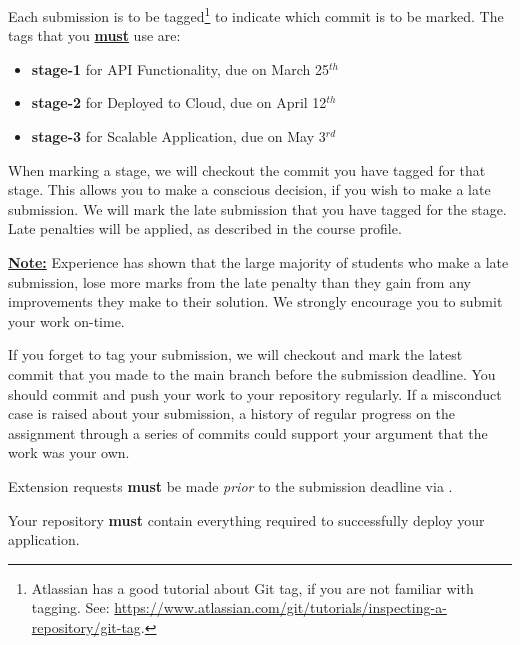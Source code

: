 \documentclass{csse4400}
\begin{document}
Each submission is to be tagged\footnote{Atlassian has a good tutorial about Git tag, if you are not familiar with tagging. See: \url{https://www.atlassian.com/git/tutorials/inspecting-a-repository/git-tag}.}
to indicate which commit is to be marked.
The tags that you \textbf{\underline{must}} use are:
\begin{itemize}
  \item \textbf{stage-1} for API Functionality, due on March 25$^{th}$
  \item \textbf{stage-2} for Deployed to Cloud, due on April 12$^{th}$
  \item \textbf{stage-3} for Scalable Application, due on May 3$^{rd}$
\end{itemize}

When marking a stage, we will checkout the commit you have tagged for that stage.
This allows you to make a conscious decision, if you wish to make a late submission.
We will mark the late submission that you have tagged for the stage.
Late penalties will be applied, as described in the course profile.

\textbf{\underline{Note:}} Experience has shown that the large majority of students who make a late submission,
lose more marks from the late penalty than they gain from any improvements they make to their solution.
We strongly encourage you to submit your work on-time.

If you forget to tag your submission, we will checkout and mark the latest commit that you made to the main branch before the submission deadline.
You should commit and push your work to your repository regularly.
If a misconduct case is raised about your submission, a history of regular progress on the assignment through a series of commits could support your argument that the work was your own.

Extension requests \textbf{must} be made \emph{prior} to the submission deadline via .

Your repository \textbf{must} contain everything required to successfully deploy your application.
\end{document}
